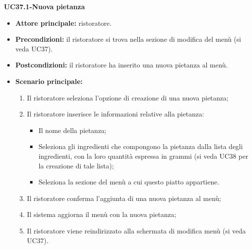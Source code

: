 \textbf{UC37.1-Nuova pietanza}  
\begin{itemize}
    \item \textbf{Attore principale:} ristoratore.
    \item \textbf{Precondizioni:} il ristoratore si trova nella sezione di modifica del menù (si veda UC37).
    \item \textbf{Postcondizioni:} il ristoratore ha inserito una nuova pietanza al menù.
    \item \textbf{Scenario principale:}
    \begin{enumerate}
        \item Il ristoratore seleziona l'opzione di creazione di una nuova pietanza;
        \item Il ristoratore inserisce le informazioni relative alla pietanza:
        \begin{itemize}
            \item Il nome della pietanza;
            \item Seleziona gli ingredienti che compongono la pietanza dalla lista degli ingredienti, con la loro quantità espressa in grammi (si veda UC38 per la creazione di tale lista);
            \item Seleziona la sezione del menù a cui questo piatto appartiene.
        \end{itemize}
        \item Il ristoratore conferma l'aggiunta di una nuova pietanza al menù;
        \item Il sistema aggiorna il menù con la nuova pietanza;
        \item Il ristoratore viene reindirizzato alla schermata di modifica menù (si veda UC37).
    \end{enumerate}
\end{itemize}

